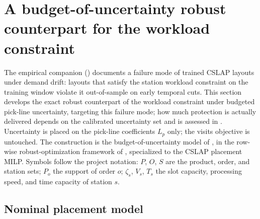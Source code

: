 %

\section{A budget-of-uncertainty robust counterpart for the workload constraint}
\label{sec:theory}

The empirical companion () documents a failure mode of
trained CSLAP layouts under demand drift: layouts that satisfy the station
workload constraint on the training window violate it out-of-sample on early
temporal cuts. This section develops the exact robust counterpart of the
workload constraint under budgeted pick-line uncertainty, targeting this
failure mode; how much protection is actually delivered depends on the
calibrated uncertainty set and is assessed in .
Uncertainty is placed on the pick-line coefficients $L_p$ only; the visits
objective is untouched. The construction is the budget-of-uncertainty model
of \citet{bertsimas2004}, in the row-wise robust-optimization framework of
\citet{bental2009robust}, specialized to the CSLAP placement MILP.
Symbols follow the project notation: $P$, $O$, $S$ are the product, order, and
station sets; $P_o$ the support of order $o$; $\zeta_s$, $V_s$, $T_s$ the slot
capacity, processing speed, and time capacity of station $s$.

\subsection{Nominal placement model}
\label{sec:nominal}

